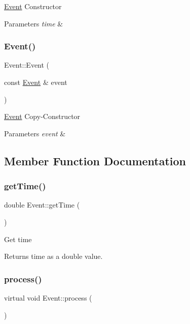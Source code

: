 \hyperlink{classEvent}{Event} Constructor 
\begin{DoxyParams}{Parameters}
{\em time} & \\
\hline
\end{DoxyParams}
\mbox{\label{classEvent_ae8b35bf9237b74824194f87128e4fdab}} 
\subsubsection{\texorpdfstring{Event()}{Event()}\hspace{0.1cm}{\footnotesize\ttfamily [2/2]}}
{\footnotesize\ttfamily Event\+::\+Event (\begin{DoxyParamCaption}\item[{const \hyperlink{classEvent}{Event} \&}]{event }\end{DoxyParamCaption})}

\hyperlink{classEvent}{Event} Copy-\/\+Constructor 
\begin{DoxyParams}{Parameters}
{\em event} & \\
\hline
\end{DoxyParams}


\subsection{Member Function Documentation}
\mbox{\label{classEvent_ab05b23f7cc8d126efcbf189062f3b275}} 
\subsubsection{\texorpdfstring{get\+Time()}{getTime()}}
{\footnotesize\ttfamily double Event\+::get\+Time (\begin{DoxyParamCaption}{ }\end{DoxyParamCaption})}

Get time \begin{DoxyReturn}{Returns}
time as a double value. 
\end{DoxyReturn}
\mbox{\label{classEvent_af1940e82c4da67c8119f0dfe026949b4}} 
\subsubsection{\texorpdfstring{process()}{process()}}
{\footnotesize\ttfamily virtual void Event\+::process (\begin{DoxyParamCaption}{ }\end{DoxyParamCaption})\hspace{0.3cm}{\ttfamily [pure virtual]}}

